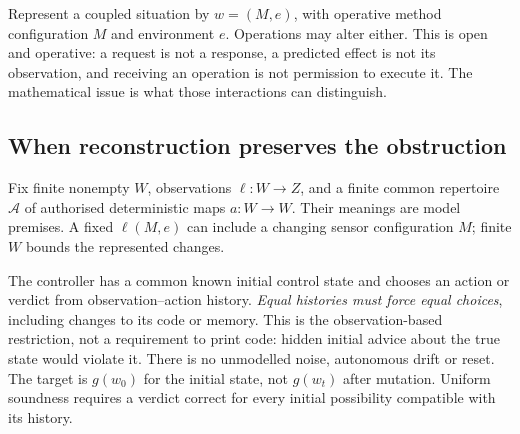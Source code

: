 \documentclass[11pt]{article}
\newcommand{\cA}{\mathcal A}
\begin{document}
Represent a coupled situation by $w=(M,e)$, with operative method configuration $M$ and environment $e$. Operations may alter either. This is open and operative: a request is not a response, a predicted effect is not its observation, and receiving an operation is not permission to execute it. The mathematical issue is what those interactions can distinguish.

\subsection{When reconstruction preserves the obstruction}\label{sec:congruence}
Fix finite nonempty $W$, observations $\ell:W\to Z$, and a finite common repertoire $\cA$ of authorised deterministic maps $a:W\to W$. Their meanings are model premises. A fixed $\ell(M,e)$ can include a changing sensor configuration $M$; finite $W$ bounds the represented changes.

The controller has a common known initial control state and chooses an action or verdict from observation--action history. \emph{Equal histories must force equal choices}, including changes to its code or memory. This is the observation-based restriction, not a requirement to print code: hidden initial advice about the true state would violate it. There is no unmodelled noise, autonomous drift or reset. The target is $g(w_0)$ for the initial state, not $g(w_t)$ after mutation. Uniform soundness requires a verdict correct for every initial possibility compatible with its history.
\end{document}
